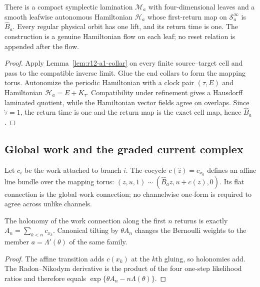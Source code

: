 \begin{theorem}
\label{thm:r12-a1-suspension}
There is a compact symplectic lamination $\mathcal M_a$ with four-dimensional
leaves and a smooth leafwise autonomous Hamiltonian $\mathscr H_a$ whose
first-return map on $\mathscr S_a^\infty$ is $\widehat B_a$.  Every regular
physical orbit has one lift, and its return time is one.  The construction is
a genuine Hamiltonian flow on each leaf; no reset relation is appended after
the flow.
\end{theorem}

\begin{proof}
Apply Lemma~\ref{lem:r12-a1-collar} on every finite source--target cell and
pass to the compatible inverse limit.  Glue the end collars to form the
mapping torus.  Autonomize the periodic Hamiltonian with a clock pair
$(\tau,E)$ and Hamiltonian $\mathscr H_a=E+K_\tau$.  Compatibility under
refinement gives a Hausdorff laminated quotient, while the Hamiltonian vector
fields agree on overlaps.  Since $\dot\tau=1$, the return time is one and the
return map is the exact cell map, hence $\widehat B_a$.
\end{proof}

\subsection{Global work and the graded current complex}

Let $c_i$ be the work attached to branch $i$.  The cocycle
$c(\widehat z)=c_{x_0}$ defines an affine line bundle over the mapping torus:
$(z,u,1)\sim(\widehat B_az,u+c(z),0)$.  Its flat connection is the global work
connection; no channelwise one-form is required to agree across unlike
channels.

\begin{proposition}
\label{prop:r12-a1-work}
The holonomy of the work connection along the first $n$ returns is exactly
$A_n=\sum_{k<n}c_{x_k}$.  Canonical tilting by $\theta A_n$ changes the
Bernoulli weights to the member $a=\Lambda'(\theta)$ of the same family.
\end{proposition}

\begin{proof}
The affine transition adds $c(x_k)$ at the $k$th gluing, so holonomies add.
The Radon--Nikodym derivative is the product of the four one-step likelihood
ratios and therefore equals
$\exp\{\theta A_n-n\Lambda(\theta)\}$.
\end{proof}

